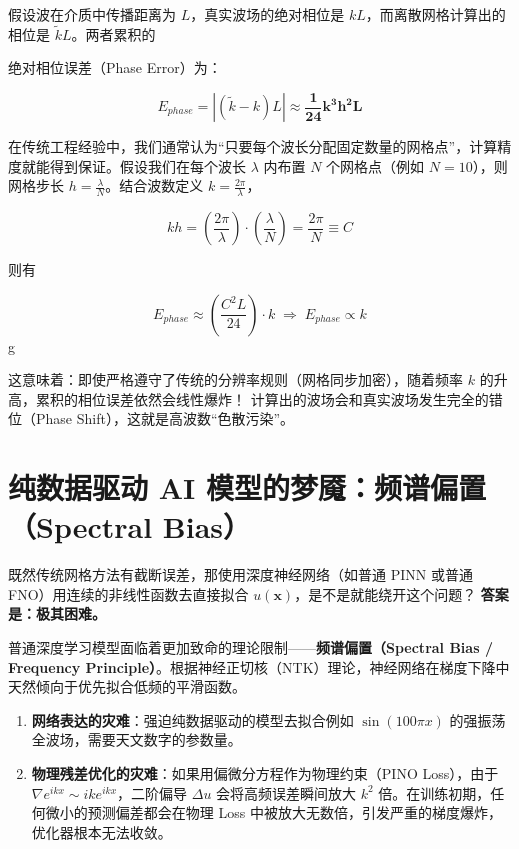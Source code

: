 \documentclass[12pt]{article}
\begin{document}
假设波在介质中传播距离为 $L$，真实波场的绝对相位是 $kL$，而离散网格计算出的相位是 $\tilde{k}L$。两者累积的{绝对相位误差（Phase Error）为：

\begin{equation}
E_{phase} = | (\tilde{k} - k) L | \approx \mathbf{\frac{1}{24} k^3 h^2 L}
\label{eq:1-8}
\end{equation}

在传统工程经验中，我们通常认为“只要每个波长分配固定数量的网格点”，计算精度就能得到保证。假设我们在每个波长 $\lambda$ 内布置 $N$ 个网格点（例如 $N=10$），则网格步长 $h = \frac{\lambda}{N}$。结合波数定义 $k = \frac{2\pi}{\lambda}$，

\begin{equation}
kh = \left(\frac{2\pi}{\lambda}\right) \cdot \left(\frac{\lambda}{N}\right) = \frac{2\pi}{N} \equiv C
\label{eq:kh-constant}
\end{equation}

则有

\begin{equation}
E_{phase} \approx \left( \frac{C^2 L}{24} \right) \cdot k
\;\Longrightarrow\;
E_{phase} \propto k
\label{eq:phase-error-scaling-law}
\end{equation}g

这意味着：即使严格遵守了传统的分辨率规则（网格同步加密），随着频率 $k$ 的升高，累积的相位误差依然会线性爆炸！ 计算出的波场会和真实波场发生完全的错位（Phase Shift），这就是高波数“色散污染”。

\section{纯数据驱动 AI 模型的梦魇：频谱偏置（Spectral Bias）}

既然传统网格方法有截断误差，那使用深度神经网络（如普通 PINN 或普通 FNO）用连续的非线性函数去直接拟合 $u(\mathbf{x})$，是不是就能绕开这个问题？
\textbf{答案是：极其困难。}

普通深度学习模型面临着更加致命的理论限制——\textbf{频谱偏置（Spectral Bias / Frequency Principle）}。根据神经正切核（NTK）理论，神经网络在梯度下降中天然倾向于优先拟合低频的平滑函数。

\begin{enumerate}[leftmargin=2em]
    \item \textbf{网络表达的灾难}：强迫纯数据驱动的模型去拟合例如 $\sin(100\pi x)$ 的强振荡全波场，需要天文数字的参数量。
    
    \item \textbf{物理残差优化的灾难}：如果用偏微分方程作为物理约束（PINO Loss），由于 $\nabla e^{ikx} \sim i k e^{ikx}$，二阶偏导 $\Delta u$ 会将高频误差瞬间放大 $k^2$ 倍。在训练初期，任何微小的预测偏差都会在物理 Loss 中被放大无数倍，引发严重的梯度爆炸，优化器根本无法收敛。
\end{enumerate}

}
\end{document}
